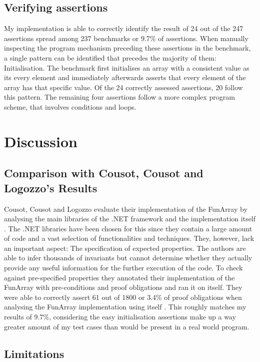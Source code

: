 \documentclass{report}
\begin{document}
\subsection{Verifying assertions}

My implementation is able to correctly identify the result of 24 out of the 247 assertions spread among 237 benchmarks or 9.7\% of assertions. When manually inspecting the program mechanism preceding these assertions in the benchmark, a single pattern can be identified that precedes the majority of them: Initialisation. The benchmark first initialises an array with a consistent value as its every element and immediately afterwards asserts that every element of the array has that specific value. Of the 24 correctly assessed assertions, 20 follow this pattern. The remaining four assertions follow a more complex program scheme, that involves conditions and loops.



\section{Discussion}
\subsection{Comparison with Cousot, Cousot and Logozzo's Results}

Cousot, Cousot and Logozzo evaluate their implementation of the FunArray by analysing the main libraries of the .NET framework and the implementation itself \cite{cousot2011}. The .NET libraries have been chosen for this since they contain a large amount of code and a vast selection of functionalities and techniques. They, however, lack an important aspect: The specification of expected properties. The authors are able to infer thousands of invariants but cannot determine whether they actually provide any useful information for the further execution of the code. To check against pre-specified properties they annotated their implementation of the FunArray with pre-conditions and proof obligations and ran it on itself. They were able to correctly assert 61 out of 1800 or 3.4\% of proof obligations when analysing the FunArray implementation using itself \cite{cousot2011}. This roughly matches my results of 9.7\%, considering the easy initialisation assertions make up a way greater amount of my test cases than would be present in a real world program.

\subsection{Limitations}
\end{document}
